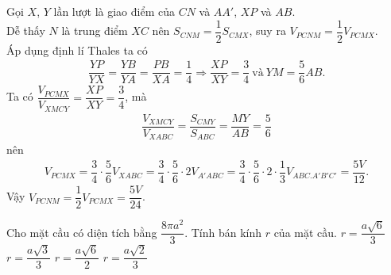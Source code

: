 \begin{ex}
{\begin{center}
		\end{center}
		Gọi $X$, $Y$ lần lượt là giao điểm của $CN$ và $AA'$, $XP$ và $AB$.\\
		Dễ thấy $N$ là trung điểm $XC$ nên $S_{CNM}=\dfrac{1}{2}S_{CMX}$, suy ra $V_{PCNM}=\dfrac{1}{2}V_{PCMX}$.\\ 
		Áp dụng định lí Thales ta có
		\begin{align*}
		\dfrac{YP}{YX}=\dfrac{YB}{YA}=\dfrac{PB}{XA}=\dfrac{1}{4}\Rightarrow \dfrac{XP}{XY}=\dfrac{3}{4}\ \text{và}\ YM=\dfrac{5}{6}AB.
		\end{align*}
		Ta có $\dfrac{V_{PCMX}}{V_{XMCY}}=\dfrac{XP}{XY}=\dfrac{3}{4}$, mà
		\begin{align*}
		\dfrac{V_{XMCY}}{V_{XABC}}=\dfrac{S_{CMY}}{S_{ABC}}=\dfrac{MY}{AB}=\dfrac{5}{6}
		\end{align*}
		nên 
		\begin{align*}
		V_{PCMX}=\dfrac{3}{4}\cdot \dfrac{5}{6}V_{XABC}=\dfrac{3}{4}\cdot \dfrac{5}{6}\cdot 2V_{A'ABC}=\dfrac{3}{4}\cdot \dfrac{5}{6}\cdot 2\cdot \dfrac{1}{3}V_{ABC.A'B'C'}=\dfrac{5V}{12}.
		\end{align*}
		Vậy $V_{PCNM}=\dfrac{1}{2}V_{PCMX}= \dfrac{5V}{24}$.
	}
\end{ex}

\begin{ex}%
	Cho mặt cầu có diện tích bằng $\dfrac{8\pi a^2}{3}$. Tính bán kính $r$ của mặt cầu.
	\choice
	{\True $r=\dfrac{a\sqrt{6}}{3}$}
	{$r=\dfrac{a\sqrt{3}}{3}$}
	{$r=\dfrac{a\sqrt{6}}{2}$}
	{$r=\dfrac{a\sqrt{2}}{3}$}
\end{ex}

